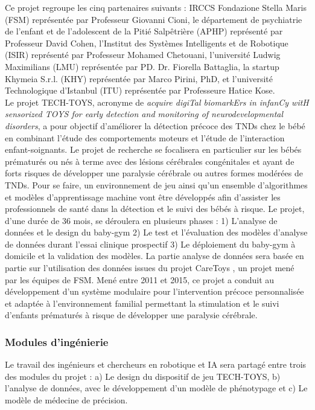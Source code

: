 \documentclass[5pt]{article}
\begin{document}
\par Ce projet regroupe les cinq partenaires suivants : IRCCS Fondazione Stella Maris (FSM) représentée par Professeur Giovanni Cioni, le département de psychiatrie de l’enfant et de l’adolescent de la Pitié Salpêtrière (APHP) représenté par Professeur David Cohen, l’Institut des Systèmes Intelligents et de Robotique (ISIR) représenté par Professeur Mohamed Chetouani, l’université Ludwig Maximilians (LMU) représentée par PD. Dr. Fiorella Battaglia, la startup Khymeia S.r.l. (KHY) représentée par Marco Pirini,
PhD, et l’université Technologique d’Istanbul (ITU) représentée par Professeure Hatice Kose.\\
Le projet TECH-TOYS, acronyme de \textit{acquire digiTal biomarkErs in infanCy witH sensorized TOYS for
early detection and monitoring of neurodevelopmental disorders}, a pour objectif d’améliorer la détection
précoce des TNDs chez le bébé en combinant l’étude des comportements moteurs et l’étude de l’interaction
enfant-soignants. Le projet de recherche se focalisera en particulier sur les bébés prématurés ou nés à terme
avec des lésions cérébrales congénitales et ayant de forts risques de développer une paralysie cérébrale ou
autres formes modérées de TNDs. Pour se faire, un environnement de jeu ainsi qu’un ensemble d’algorithmes
et modèles d’apprentissage machine vont être développés afin d’assister les professionnels de santé dans
la détection et le suivi des bébés à risque. Le projet, d’une durée de 36 mois, se déroulera en plusieurs
phases : 1) L’analyse de données et le design du baby-gym 2) Le test et l’évaluation des modèles d’analyse
de données durant l’essai clinique prospectif 3) Le déploiement du baby-gym à domicile et la validation des
modèles. La partie analyse de données sera basée en partie sur l’utilisation des données issues du projet
CareToys \cite{rihar_infant_2019}, un projet mené par les équipes de FSM. Mené entre 2011 et 2015, ce projet
a conduit au développement d’un système modulaire pour l’intervention précoce personnalisée et adaptée à l’environnement familial permettant la stimulation et le suivi d’enfants prématurés à risque de développer une paralysie cérébrale.

\subsubsection{Modules d'ingénierie}
\par Le travail des ingénieurs et chercheurs en robotique et IA sera partagé entre trois des modules du projet : a) Le design du dispositif de jeu TECH-TOYS, b) l’analyse de données, avec le développement d’un modèle de phénotypage et c) Le modèle de médecine de précision.\\ \\
 
\end{document}
